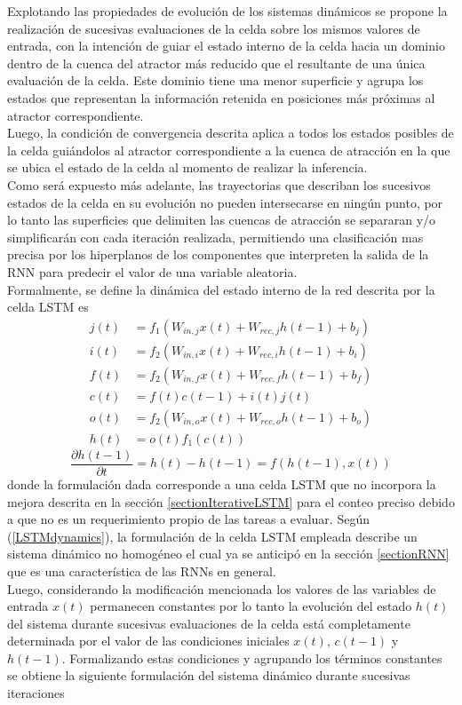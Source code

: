 \documentclass{article}
\begin{document}
	Explotando las propiedades de evolución de los sistemas dinámicos se propone la realización de sucesivas evaluaciones de la celda sobre los mismos valores de entrada, con la intención de guiar el estado interno de la celda hacia un dominio dentro de la cuenca del atractor más reducido que el resultante de una única evaluación de la celda. Este dominio tiene una menor superficie y agrupa los estados que representan la información retenida en posiciones más próximas al atractor correspondiente.\\
	Luego, la condición de convergencia descrita aplica a todos los estados posibles de la celda guiándolos al atractor correspondiente a la cuenca de atracción en la que se ubica el estado de la celda al momento de realizar la inferencia. \\
	Como será expuesto más adelante, las trayectorias que describan los sucesivos estados de la celda en su evolución no pueden intersecarse en ningún punto, por lo tanto las superficies que delimiten las cuencas de atracción se separaran y/o simplificarán con cada iteración realizada, permitiendo una clasificación mas precisa por los hiperplanos de los componentes que interpreten la salida de la RNN para predecir el valor de una variable aleatoria.\\
	Formalmente, se define la dinámica del estado interno de la red descrita por la celda LSTM es
	\begin{equation*}
	\begin{split}
	j(t) &= f_1(W_{in, j} x(t) + W_{rec, j} h(t-1) + b_{j})\\
	i(t) &= f_2(W_{in, i} x(t) + W_{rec, i} h(t-1) + b_{i})\\
	f(t) &= f_2(W_{in, f} x(t) + W_{rec, f} h(t-1) + b_f)\\
	c(t) &= f(t)c(t-1) + i(t)j(t)\\
	o(t) &= f_2(W_{in, o} x(t) + W_{rec, o} h(t-1) + b_o)\\
	h(t) &= o(t)f_1(c(t))
	\end{split}
	\end{equation*}
	\begin{equation}\label{LSTMdynamics}
	\dfrac{\partial h(t-1)}{\partial t} = h(t) - h(t-1) = f(h(t-1), x(t))
	\end{equation}
	donde la formulación dada corresponde a una celda LSTM que no incorpora la mejora descrita en la sección \ref{sectionIterativeLSTM} para el conteo preciso debido a que no es un requerimiento propio de las tareas a evaluar. Según (\ref{LSTMdynamics}), la formulación de la celda LSTM empleada describe un sistema dinámico no homogéneo el cual ya se anticipó en la sección \ref{sectionRNN} que es una característica de las RNNs en general.\\
	Luego, considerando la modificación mencionada los valores de las variables de entrada $x(t)$ permanecen constantes por lo tanto la evolución del estado $h(t)$ del sistema durante sucesivas evaluaciones de la celda está completamente determinada por el valor de las condiciones iniciales $x(t)$, $c(t-1)$ y $h(t-1)$. Formalizando estas condiciones y agrupando los términos constantes se obtiene la siguiente formulación del sistema dinámico durante sucesivas iteraciones
	
\end{document}
